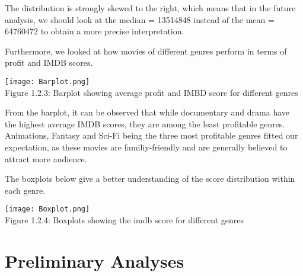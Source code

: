 \documentclass[12pt]{article}
\begin{document}
\begin{multicols}{2}
The distribution is strongly skewed to the right, which means that in the future analysis, we should look at the median = 13514848 instead of the mean = 64760472 to obtain a more precise interpretation. 
\par

Furthermore, we looked at how movies of different genres perform in terms of profit and IMDB scores. \par
\begin{center}
\texttt{[image: Barplot.png]}\\
\footnotesize Figure 1.2.3: Barplot showing average profit and IMBD score for different genres
\end{center}
\par
From the barplot, it can be observed that while documentary and drama have the highest average IMDB scores, they are among the least profitable genres. Animations, Fantasy and Sci-Fi being the three most profitable genres fitted our expectation, as these movies are familiy-friendly and are generally believed to attract more audience. 
\par The boxplots below give a better understanding of the score distribution within each genre.
\begin{center}
\texttt{[image: Boxplot.png]}\\
\footnotesize Figure 1.2.4: Boxplots showing the imdb score for different genres
\end{center}
\par
\bigskip
\section{Preliminary Analyses}
\par
\bigskip

\end{multicols}
\end{document}
